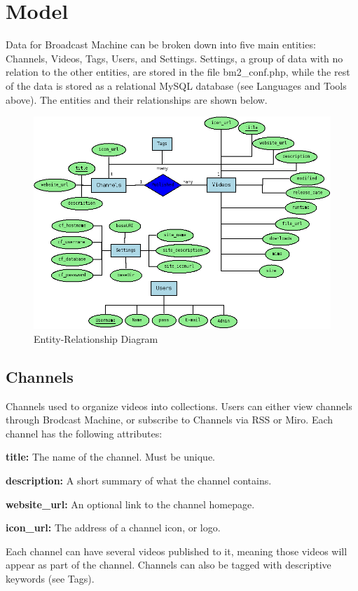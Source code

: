 \documentclass[a4paper,12pt]{report}
\begin{document}
\section{Model}
Data for Broadcast Machine can be broken down into five main entities: Channels, Videos, Tags, Users, and Settings. Settings, a group of data with no relation to the other entities, are stored in the file bm2\_conf.php, while the rest of the data is stored as a relational MySQL database (see Languages and Tools above). The entities and their relationships are shown below.
\begin{figure}[h]
\begin{center}
\includegraphics[scale=0.45]{./images/er.png}
\end{center}
\caption{Entity-Relationship Diagram}
\end{figure}

\subsection*{Channels}
Channels used to organize videos into collections. Users can either view channels through Brodcast Machine, or subscribe to Channels via RSS or Miro. Each channel has the following attributes:
\begin{description}
\item{\textbf{title: } The name of the channel. Must be unique.}
\item{\textbf{description: } A short summary of what the channel contains.}
\item{\textbf{website\_url: } An optional link to the channel homepage.}
\item{\textbf{icon\_url: } The address of a channel icon, or logo.} \\
\end{description}
Each channel can have several videos published to it, meaning those videos will appear as part of the channel. Channels can also be tagged with descriptive keywords (see Tags).
\end{document}
